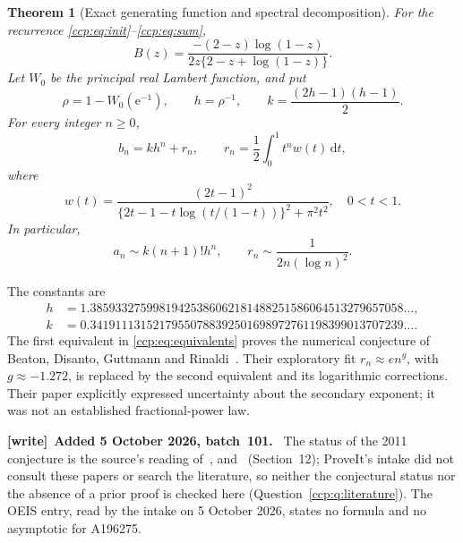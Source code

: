 \documentclass[11pt,letterpaper]{article}
\newtheorem{theorem}{Theorem}[section]
\theoremstyle{remark}\newtheorem{remark}[theorem]{Remark}
\newcommand{\dd}{\,\mathrm d}
\newcommand{\ee}{\mathrm e}
\newenvironment{writenote}[1][]{\par\smallskip\begingroup\small
 \noindent\textbf{[write]}\if\relax\detokenize{#1}\relax\else~\textbf{#1.}\fi\ }%
 {\par\endgroup\smallskip}
\begin{document}
\begin{theorem}[Exact generating function and spectral decomposition]\label{ccp:thm:main}
For the recurrence \eqref{ccp:eq:init}--\eqref{ccp:eq:sum},
\begin{equation}
B(z)=\frac{-(2-z)\log(1-z)}{2z\{2-z+\log(1-z)\}}.\label{ccp:eq:gf}
\end{equation}
Let $W_0$ be the principal real Lambert function, and put
\begin{equation}
\rho=1-W_0(\ee^{-1}),\qquad h=\rho^{-1},\qquad
k=\frac{(2h-1)(h-1)}2.\label{ccp:eq:hk}
\end{equation}
For every integer $n\ge0$,
\begin{equation}
b_n=kh^n+r_n,\qquad r_n=\frac12\int_0^1t^nw(t)\dd t,\label{ccp:eq:spectral}\end{equation}
where
\begin{equation}
w(t)=\frac{(2t-1)^2}
 {\{2t-1-t\log(t/(1-t))\}^2+\pi^2t^2},\quad0<t<1.\label{ccp:eq:density}
\end{equation}
In particular,
\begin{equation}
a_n\sim k(n+1)!h^n,
\qquad r_n\sim\frac1{2n(\log n)^2}.\label{ccp:eq:equivalents}
\end{equation}
\end{theorem}
The constants are
\begin{align*}
h&=1.38593327599819425386062181488251586064513279657058\ldots,\\
k&=0.34191113152179550788392501698972761198399013707239\ldots.
\end{align*}
The first equivalent in \eqref{ccp:eq:equivalents} proves the numerical conjecture of Beaton, Disanto, Guttmann and Rinaldi~\cite[Section 3.3]{bdgr}. Their exploratory fit $r_n\approx e n^g$, with $g\approx-1.272$, is replaced by the second equivalent and its logarithmic corrections. Their paper explicitly expressed uncertainty about the secondary exponent; it was not an established fractional-power law.

\begin{writenote}[Added 5 October 2026, batch~101]
The status of the 2011 conjecture is the source's reading of~\cite{bdgr},
\cite{rs2014} and~\cite{drs2018} (Section~12); ProveIt's intake did not
consult these papers or search the literature, so neither the conjectural
status nor the absence of a prior proof is checked here
(Question~\ref{ccp:q:literature}). The OEIS entry, read by the intake on
5 October 2026, states no formula and no asymptotic for A196275.
\end{writenote}
\end{document}
